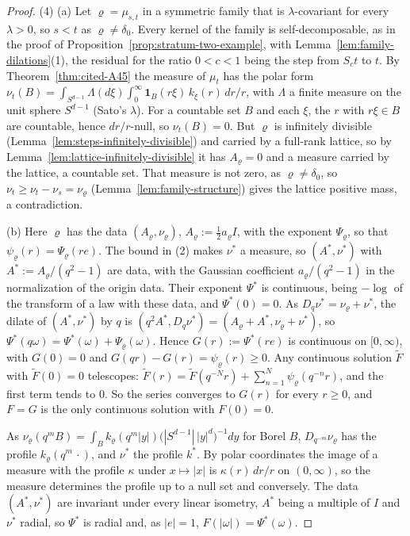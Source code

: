 \begin{proof}
(4) (a) Let $\varrho = \mu_{s,t}$ in a symmetric family that is $\lambda$-covariant for every
$\lambda > 0$, so $s < t$ as $\varrho \ne \delta_0$. Every kernel of the family is
self-decomposable, as in the proof of Proposition~\ref{prop:stratum-two-example}, with
Lemma~\ref{lem:family-dilations}(1), the residual for the ratio $0 < c < 1$ being the step from
$S_ct$ to $t$. By Theorem~\ref{thm:cited-A45} the \Levy{} measure of $\mu_t$ has the
polar form $\nu_t(B) = \int_{S^{d-1}}\Lambda(d\xi)\int_0^\infty\mathbf 1_B(r\xi)\,k_\xi(r)\,dr/r$, with
$\Lambda$ a finite measure on the unit sphere $S^{d-1}$ (Sato's $\lambda$). For a countable set $B$ and
each $\xi$, the $r$ with $r\xi \in B$ are countable, hence $dr/r$-null, so $\nu_t(B) = 0$. But
$\varrho$ is infinitely divisible (Lemma~\ref{lem:steps-infinitely-divisible}) and carried by a full-rank
lattice, so by Lemma~\ref{lem:lattice-infinitely-divisible} it has $A_\varrho = 0$ and a \Levy{}
measure carried by the lattice, a countable set. That measure is not zero, as
$\varrho \ne \delta_0$, so $\nu_t \ge \nu_t - \nu_s = \nu_\varrho$
(Lemma~\ref{lem:family-structure}) gives the lattice positive mass, a contradiction.

(b) Here $\varrho$ has the data $(A_\varrho, \nu_\varrho)$, $A_\varrho := \tfrac12a_\varrho I$, with
the exponent $\Psi_\varrho$, so that $\psi_\varrho(r) = \Psi_\varrho(re)$. The bound in (2) makes
$\nu^*$ a \Levy{} measure, so $(A^*, \nu^*)$ with $A^* := A_\varrho/(q^2 - 1)$ are data, with the
Gaussian coefficient $a_\varrho/(q^2 - 1)$ in the normalization of the origin data. Their exponent
$\Psi^*$ is continuous, being $-\log$ of the transform of a law with these data, and
$\Psi^*(0) = 0$. As $D_q\nu^* = \nu_\varrho + \nu^*$, the dilate of $(A^*, \nu^*)$ by $q$ is
$(q^2A^*, D_q\nu^*) = (A_\varrho + A^*, \nu_\varrho + \nu^*)$, so
$\Psi^*(q\omega) = \Psi^*(\omega) + \Psi_\varrho(\omega)$. Hence $G(r) := \Psi^*(re)$ is continuous
on $[0,\infty)$, with $G(0) = 0$ and $G(qr) - G(r) = \psi_\varrho(r) \ge 0$. Any continuous solution
$\tilde F$ with $\tilde F(0) = 0$ telescopes:
$\tilde F(r) = \tilde F(q^{-N}r) + \sum_{n=1}^N\psi_\varrho(q^{-n}r)$, and the first term tends to
$0$. So the series converges to $G(r)$ for every $r \ge 0$, and $F = G$ is the only continuous
solution with $F(0) = 0$.

As $\nu_\varrho(q^mB) = \int_B k_\varrho(q^m|y|)\bigl(|S^{d-1}|\,|y|^d\bigr)^{-1}dy$ for Borel $B$,
$D_{q^{-m}}\nu_\varrho$ has the profile $k_\varrho(q^m\,\cdot)$, and $\nu^*$ the profile $k^*$. By
polar coordinates the image of a measure with the profile $\kappa$ under $x \mapsto |x|$ is
$\kappa(r)\,dr/r$ on $(0,\infty)$, so the measure determines the profile up to a null set and
conversely. The data $(A^*, \nu^*)$ are invariant under every linear isometry, $A^*$ being a multiple of $I$
and $\nu^*$ radial, so $\Psi^*$ is radial and, as $|e| = 1$, $F(|\omega|) = \Psi^*(\omega)$.


\end{proof}
